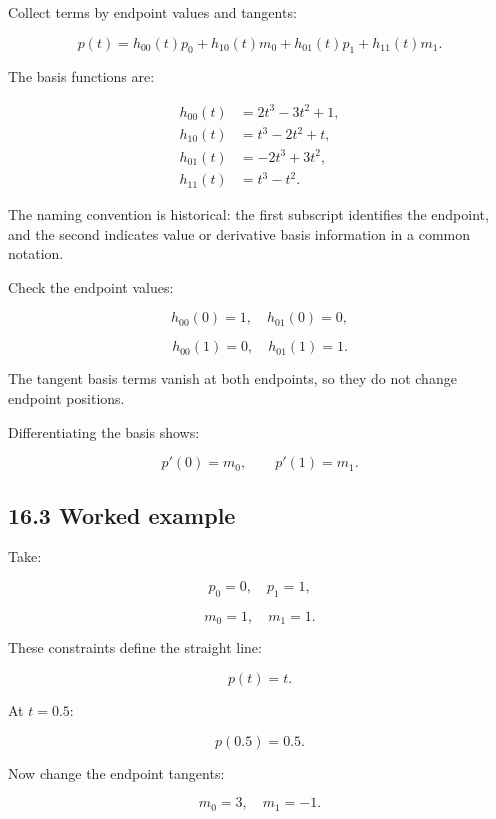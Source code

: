 \hypertarget{02-foundations-ii-ch028-hermite-basis-functions}{}

Collect terms by endpoint values and tangents:

\[ \boxed{ p(t)= h_{00}(t)p_0+ h_{10}(t)m_0+ h_{01}(t)p_1+ h_{11}(t)m_1 }. \]

The basis functions are:

\[ \boxed{ \begin{aligned} h_{00}(t)&=2t^3-3t^2+1,\\ h_{10}(t)&=t^3-2t^2+t,\\ h_{01}(t)&=-2t^3+3t^2,\\ h_{11}(t)&=t^3-t^2. \end{aligned} } \]

The naming convention is historical: the first subscript identifies the endpoint, and the second indicates value or derivative basis information in a common notation.

Check the endpoint values:

\[ h_{00}(0)=1,\quad h_{01}(0)=0, \]

\[ h_{00}(1)=0,\quad h_{01}(1)=1. \]

The tangent basis terms vanish at both endpoints, so they do not change endpoint positions.

Differentiating the basis shows:

\[ p'(0)=m_0,\qquad p'(1)=m_1. \]

\begin{allmightroleexample}

\subsection{16.3 Worked example}\label{02-foundations-ii-ch028-worked-example-3}

\hypertarget{02-foundations-ii-ch028-worked-example-3}{}

Take:

\end{allmightroleexample}

\[ p_0=0,\quad p_1=1, \]

\[ m_0=1,\quad m_1=1. \]

These constraints define the straight line:

\[ \boxed{p(t)=t}. \]

At \(t=0.5\):

\[ p(0.5)=0.5. \]

Now change the endpoint tangents:

\[ m_0=3,\quad m_1=-1. \]

